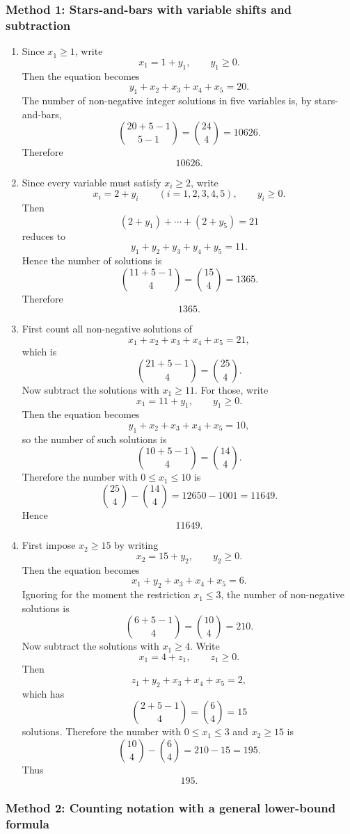 \documentclass[12pt]{article}
\begin{document}
\subsubsection{Method 1: Stars-and-bars with variable shifts and subtraction}
\begin{enumerate}[label=(\alph*)]
\item Since $x_1\ge 1$, write
\[
x_1=1+y_1, \qquad y_1\ge 0.
\]
Then the equation becomes
\[
y_1+x_2+x_3+x_4+x_5=20.
\]
The number of non-negative integer solutions in five variables is, by stars-and-bars,
\[
\binom{20+5-1}{5-1}=\binom{24}{4}=10626.
\]
Therefore
\[
\boxed{10626}.
\]

\item Since every variable must satisfy $x_i\ge 2$, write
\[
x_i=2+y_i \qquad (i=1,2,3,4,5), \qquad y_i\ge 0.
\]
Then
\[
(2+y_1)+\cdots +(2+y_5)=21
\]
reduces to
\[
y_1+y_2+y_3+y_4+y_5=11.
\]
Hence the number of solutions is
\[
\binom{11+5-1}{4}=\binom{15}{4}=1365.
\]
Therefore
\[
\boxed{1365}.
\]

\item First count all non-negative solutions of
\[
x_1+x_2+x_3+x_4+x_5=21,
\]
which is
\[
\binom{21+5-1}{4}=\binom{25}{4}.
\]
Now subtract the solutions with $x_1\ge 11$. For those, write
\[
x_1=11+y_1, \qquad y_1\ge 0.
\]
Then the equation becomes
\[
y_1+x_2+x_3+x_4+x_5=10,
\]
so the number of such solutions is
\[
\binom{10+5-1}{4}=\binom{14}{4}.
\]
Therefore the number with $0\le x_1\le 10$ is
\[
\binom{25}{4}-\binom{14}{4}=12650-1001=11649.
\]
Hence
\[
\boxed{11649}.
\]

\item First impose $x_2\ge 15$ by writing
\[
x_2=15+y_2, \qquad y_2\ge 0.
\]
Then the equation becomes
\[
x_1+y_2+x_3+x_4+x_5=6.
\]
Ignoring for the moment the restriction $x_1\le 3$, the number of non-negative solutions is
\[
\binom{6+5-1}{4}=\binom{10}{4}=210.
\]
Now subtract the solutions with $x_1\ge 4$. Write
\[
x_1=4+z_1, \qquad z_1\ge 0.
\]
Then
\[
z_1+y_2+x_3+x_4+x_5=2,
\]
which has
\[
\binom{2+5-1}{4}=\binom{6}{4}=15
\]
solutions. Therefore the number with $0\le x_1\le 3$ and $x_2\ge 15$ is
\[
\binom{10}{4}-\binom{6}{4}=210-15=195.
\]
Thus
\[
\boxed{195}.
\]
\end{enumerate}

\subsubsection{Method 2: Counting notation with a general lower-bound formula}
\end{document}
